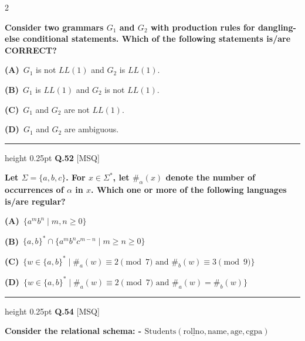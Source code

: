\documentclass[a4paper,10pt,twoside]{article}
\begin{document}
\begin{multicols}{2}
\par\vspace{2pt}
{\bfseries Consider two grammars $G_1$ and $G_2$ with production rules for dangling-else conditional statements. Which of the following statements is/are CORRECT? \par}
\par\vspace{2pt}\noindent
\textbf{(A)}~$G_1$ is not $LL(1)$ and $G_2$ is $LL(1)$.\par\vspace{2pt}\noindent
\textbf{(B)}~$G_1$ is $LL(1)$ and $G_2$ is not $LL(1)$.\par\vspace{2pt}\noindent
\textbf{(C)}~$G_1$ and $G_2$ are not $LL(1)$.\par\vspace{2pt}\noindent
\textbf{(D)}~$G_1$ and $G_2$ are ambiguous.
\par\vspace{6pt}\hrule height 0.25pt\vspace{6pt}
\noindent\textbf{Q.52} \hfill {\footnotesize\textsf{[MSQ]}}
\par\vspace{2pt}
{\bfseries Let $\Sigma = \{a, b, c\}$. For $x \in \Sigma^*$, let $\#_\alpha(x)$ denote the number of occurrences of $\alpha$ in $x$. Which one or more of the following languages is/are regular? \par}
\par\vspace{2pt}\noindent
\textbf{(A)}~$\{a^m b^n \mid m, n \ge 0\}$\par\vspace{2pt}\noindent
\textbf{(B)}~$\{a, b\}^* \cap \{a^m b^n c^{m-n} \mid m \ge n \ge 0\}$\par\vspace{2pt}\noindent
\textbf{(C)}~$\{w \in \{a, b\}^* \mid \#_a(w) \equiv 2 \pmod 7 \text{ and } \#_b(w) \equiv 3 \pmod 9\}$\par\vspace{2pt}\noindent
\textbf{(D)}~$\{w \in \{a, b\}^* \mid \#_a(w) \equiv 2 \pmod 7 \text{ and } \#_a(w) = \#_b(w)\}$
\par\vspace{6pt}\hrule height 0.25pt\vspace{6pt}
\noindent\textbf{Q.54} \hfill {\footnotesize\textsf{[MSQ]}}
\par\vspace{2pt}
{\bfseries Consider the relational schema:
- $\text{Students}(\underline{\text{rollno}}, \text{name}, \text{age}, \text{cgpa})$
}
\end{multicols}
\end{document}
